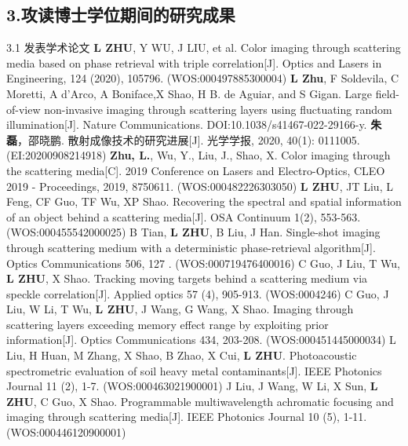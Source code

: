 \begin{resume}
\section*{3.\hspace{0.75em}攻读博士学位期间的研究成果}
\begin{resumelist}{\hspace{-0.25em}3.1\hspace{0.5em} 发表学术论文}
\resumelistitem \textbf{L ZHU}, Y WU, J LIU, et al. Color imaging through scattering media based on phase retrieval with triple correlation[J]. Optics and Lasers in Engineering, 124 (2020), 105796. (WOS:000497885300004)
\resumelistitem \textbf{L Zhu}, F Soldevila, C Moretti, A d'Arco, A Boniface,X Shao, H B. de Aguiar, and S Gigan. Large field-of-view non-invasive imaging through scattering layers using fluctuating random illumination[J]. Nature Communications. DOI:10.1038/s41467-022-29166-y.
\resumelistitem \textbf{朱磊}，邵晓鹏. 散射成像技术的研究进展[J]. 光学学报, 2020, 40(1): 0111005. (EI:20200908214918)
\resumelistitem \textbf{Zhu, L.}, Wu, Y., Liu, J., Shao, X. Color imaging through the scattering media[C]. 2019 Conference on Lasers and Electro-Optics, CLEO 2019 - Proceedings, 2019, 8750611. (WOS:000482226303050)
\resumelistitem \textbf{L ZHU}, JT Liu, L Feng, CF Guo, TF Wu, XP Shao. Recovering the spectral and spatial information of an object behind a scattering media[J]. OSA Continuum 1(2), 553-563. (WOS:000455542000025)
\resumelistitem B Tian, \textbf{L ZHU}, B Liu, J Han. Single-shot imaging through scattering medium with a deterministic phase-retrieval algorithm[J]. Optics Communications 506, 127 . (WOS:000719476400016)
\resumelistitem C Guo, J Liu, T Wu, \textbf{L ZHU}, X Shao. Tracking moving targets behind a scattering medium via speckle correlation[J]. Applied optics 57 (4), 905-913. (WOS:0004246)
\resumelistitem C Guo, J Liu, W Li, T Wu, \textbf{L ZHU}, J Wang, G Wang, X Shao. Imaging through scattering layers exceeding memory effect range by exploiting prior information[J]. Optics Communications 434, 203-208. (WOS:000451445000034)
\resumelistitem L Liu, H Huan, M Zhang, X Shao, B Zhao, X Cui, \textbf{L ZHU}. Photoacoustic spectrometric evaluation of soil heavy metal contaminants[J]. IEEE Photonics Journal 11 (2), 1-7. (WOS:000463021900001)
\resumelistitem J Liu, J Wang, W Li, X Sun, \textbf{L ZHU}, C Guo, X Shao. Programmable multiwavelength achromatic focusing and imaging through scattering media[J]. IEEE Photonics Journal 10 (5), 1-11. (WOS:000446120900001)
\end{resumelist}


\end{resume}
